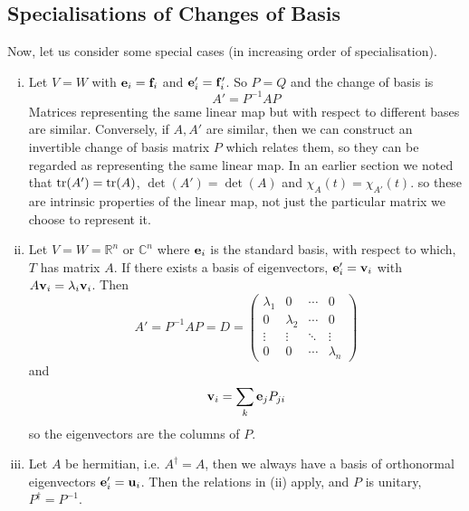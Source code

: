 \documentclass{article}
\begin{document}
\subsection{Specialisations of Changes of Basis}
Now, let us consider some special cases (in increasing order of specialisation).
\begin{enumerate}[(i)]
	\item Let $V=W$ with $\vb e_i = \vb f_i$ and $\vb e'_i = \vb f'_i$. So $P=Q$ and the change of basis is
	      \[ A' = P^{-1}AP \]
	      Matrices representing the same linear map but with respect to different bases are similar. Conversely, if $A, A'$ are similar, then we can construct an invertible change of basis matrix $P$ which relates them, so they can be regarded as representing the same linear map. In an earlier section we noted that $\tr(A') = \tr(A)$, $\det(A') = \det(A)$ and $\chi_A(t) = \chi_{A'}(t)$. so these are intrinsic properties of the linear map, not just the particular matrix we choose to represent it.
	\item Let $V=W=\mathbb R^n$ or $\mathbb C^n$ where $\vb e_i$ is the standard basis, with respect to which, $T$ has matrix $A$. If there exists a basis of eigenvectors, $\vb e'_i = \vb v_i$ with $A\vb v_i = \lambda_i\vb v_i$. Then
	      \[ A' = P^{-1}AP = D = \begin{pmatrix}
			      \lambda_1 & 0         & \cdots & 0         \\
			      0         & \lambda_2 & \cdots & 0         \\
			      \vdots    & \vdots    & \ddots & \vdots    \\
			      0         & 0         & \cdots & \lambda_n
		      \end{pmatrix} \]
	      and
	      \[ \vb v_i = \sum_k \vb e_j P_{ji} \]
	      so the eigenvectors are the columns of $P$.
	\item Let $A$ be hermitian, i.e. $A^\dagger = A$, then we always have a basis of orthonormal eigenvectors $\vb e'_i = \vb u_i$. Then the relations in (ii) apply, and $P$ is unitary, $P^\dagger = P^{-1}$.
\end{enumerate}
\end{document}
